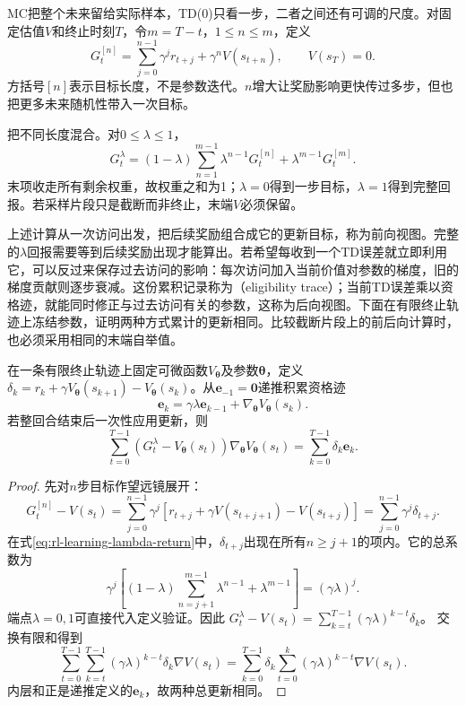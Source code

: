 MC把整个未来留给实际样本，TD(0)只看一步，二者之间还有可调的尺度。对固定估值$V$和终止时刻$T$，令$m=T-t$，$1\leq n\leq m$，定义
\begin{equation}
  G_t^{[n]}=\sum_{j=0}^{n-1}\gamma^j r_{t+j}
                    +\gamma^n V(s_{t+n}),\qquad V(s_T)=0.
  \label{eq:rl-learning-n-step}
\end{equation}
方括号$[n]$表示目标长度，不是参数迭代。$n$增大让奖励影响更快传过多步，但也把更多未来随机性带入一次目标。

把不同长度混合。对$0\leq\lambda\leq1$，
\begin{equation}
  G_t^\lambda
    =(1-\lambda)\sum_{n=1}^{m-1}\lambda^{n-1}G_t^{[n]}
                     +\lambda^{m-1}G_t^{[m]} .
  \label{eq:rl-learning-lambda-return}
\end{equation}
末项收走所有剩余权重，故权重之和为1；$\lambda=0$得到一步目标，$\lambda=1$得到完整回报。若采样片段只是截断而非终止，末端$V$必须保留。

上述计算从一次访问出发，把后续奖励组合成它的更新目标，称为前向视图。完整的$\lambda$回报需要等到后续奖励出现才能算出。若希望每收到一个TD误差就立即利用它，可以反过来保存过去访问的影响：每次访问加入当前价值对参数的梯度，旧的梯度贡献则逐步衰减。这份累积记录称为（eligibility trace）；当前TD误差乘以资格迹，就能同时修正与过去访问有关的参数，这称为后向视图。下面在有限终止轨迹上冻结参数，证明两种方式累计的更新相同。比较截断片段上的前后向计算时，也必须采用相同的末端自举值。

\begin{theorem}[固定参数下前后向更新等价]
  \label{thm:rl-learning-trace-equivalence}
  在一条有限终止轨迹上固定可微函数$V_{\bm{\theta}}$及参数$\bm{\theta}$，定义$\delta_k=r_k+\gamma V_{\bm{\theta}}(s_{k+1})-V_{\bm{\theta}}(s_k)$。从$\bm{e}_{-1}=\bm{0}$递推积累资格迹
  \[
    \bm{e}_k=\gamma\lambda\bm{e}_{k-1}
                    +\nabla_{\bm{\theta}}V_{\bm{\theta}}(s_k).
  \]
  若整回合结束后一次性应用更新，则
  \begin{equation}
    \sum_{t=0}^{T-1}
      (G_t^\lambda-V_{\bm{\theta}}(s_t))
      \nabla_{\bm{\theta}}V_{\bm{\theta}}(s_t)
      =\sum_{k=0}^{T-1}\delta_k\bm{e}_k .
    \label{eq:rl-learning-trace-equivalence}
  \end{equation}
\end{theorem}
\begin{proof}
  先对$n$步目标作望远镜展开：
  \[
    G_t^{[n]}-V(s_t)
       =\sum_{j=0}^{n-1}\gamma^j
          [r_{t+j}+\gamma V(s_{t+j+1})-V(s_{t+j})]
       =\sum_{j=0}^{n-1}\gamma^j\delta_{t+j}.
  \]
  在式\eqref{eq:rl-learning-lambda-return}中，$\delta_{t+j}$出现在所有$n\geq j+1$的项内。它的总系数为
  \[
    \gamma^j\left[(1-\lambda)
       \sum_{n=j+1}^{m-1}\lambda^{n-1}
       +\lambda^{m-1}\right]=(\gamma\lambda)^j.
  \]
  端点$\lambda=0,1$可直接代入定义验证。因此
  $G_t^\lambda-V(s_t)=\sum_{k=t}^{T-1}(\gamma\lambda)^{k-t}\delta_k$。
  交换有限和得到
  \[
    \sum_{t=0}^{T-1}\sum_{k=t}^{T-1}
       (\gamma\lambda)^{k-t}\delta_k\nabla V(s_t)
    =
    \sum_{k=0}^{T-1}\delta_k
       \sum_{t=0}^k(\gamma\lambda)^{k-t}\nabla V(s_t).
  \]
  内层和正是递推定义的$\bm{e}_k$，故两种总更新相同。
\end{proof}

